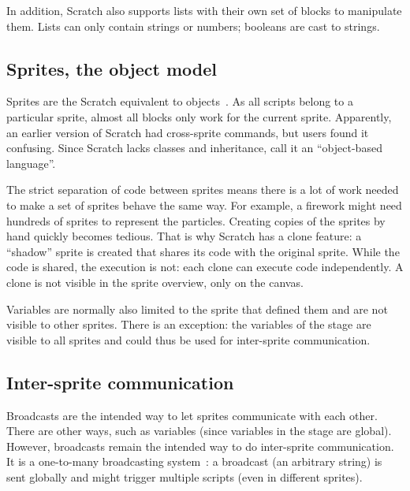 \documentclass[../main]{subfiles}
\begin{document}
In addition, Scratch also supports lists with their own set of blocks to manipulate them.
Lists can only contain strings or numbers; booleans are cast to strings.

\subsection{Sprites, the object model}\label{subsec:sprites-the-object-model}

Sprites are the Scratch equivalent to objects~\autocite{maloneyScratchProgrammingLanguage2010}.
As all scripts belong to a particular sprite, almost all blocks only work for the current sprite.
Apparently, an earlier version of Scratch had cross-sprite commands, but users found it confusing.
Since Scratch lacks classes and inheritance, \citeauthor{maloneyScratchProgrammingLanguage2010} call it an ``object-based language''.

The strict separation of code between sprites means there is a lot of work needed to make a set of sprites behave the same way.
For example, a firework might need hundreds of sprites to represent the particles.
Creating copies of the sprites by hand quickly becomes tedious.
That is why Scratch has a clone feature: a ``shadow'' sprite is created that shares its code with the original sprite.
While the code is shared, the execution is not: each clone can execute code independently.
A clone is not visible in the sprite overview, only on the canvas.

Variables are normally also limited to the sprite that defined them and are not visible to other sprites.
There is an exception: the variables of the stage are visible to all sprites and could thus be used for inter-sprite communication.

\subsection{Inter-sprite communication}\label{subsec:intersprite-communications}

\textcolor{screvent}{Broadcasts} are the intended way to let sprites communicate with each other.
There are other ways, such as variables (since variables in the stage are global).
However, broadcasts remain the intended way to do inter-sprite communication.
It is a one-to-many broadcasting system~\autocite{maloneyScratchProgrammingLanguage2010}: a broadcast (an arbitrary string) is sent globally and might trigger multiple scripts (even in different sprites).
\end{document}
